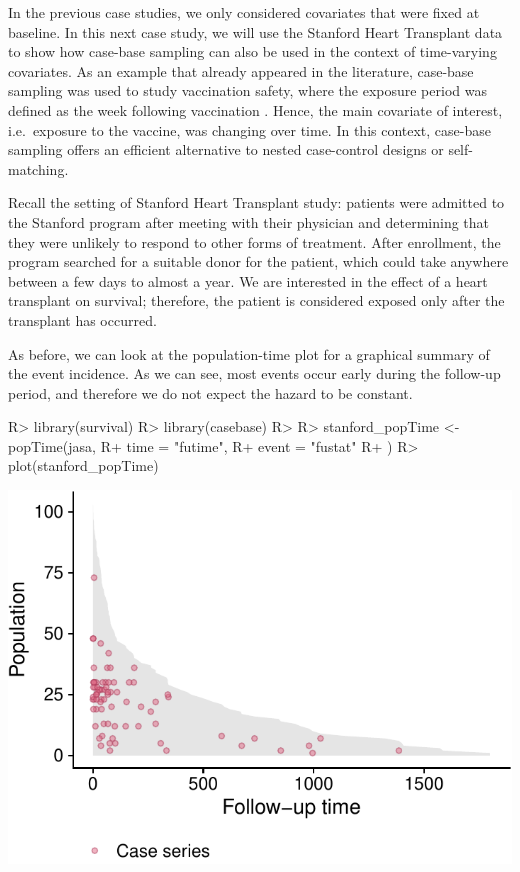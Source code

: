 \documentclass[
]{jss}
\begin{document}
In the previous case studies, we only considered covariates that were
fixed at baseline. In this next case study, we will use the Stanford
Heart Transplant data
\citep[\citet{crowley1977covariance}]{clark1971cardiac} to show how
case-base sampling can also be used in the context of time-varying
covariates. As an example that already appeared in the literature,
case-base sampling was used to study vaccination safety, where the
exposure period was defined as the week following vaccination
\citep{saarela2015case}. Hence, the main covariate of interest,
i.e.~exposure to the vaccine, was changing over time. In this context,
case-base sampling offers an efficient alternative to nested
case-control designs or self-matching.

Recall the setting of Stanford Heart Transplant study: patients were
admitted to the Stanford program after meeting with their physician and
determining that they were unlikely to respond to other forms of
treatment. After enrollment, the program searched for a suitable donor
for the patient, which could take anywhere between a few days to almost
a year. We are interested in the effect of a heart transplant on
survival; therefore, the patient is considered exposed only after the
transplant has occurred.

As before, we can look at the population-time plot for a graphical
summary of the event incidence. As we can see, most events occur early
during the follow-up period, and therefore we do not expect the hazard
to be constant.

\begin{CodeChunk}

\begin{CodeInput}
R> library(survival)
R> library(casebase)
R> 
R> stanford_popTime <- popTime(jasa,
R+   time = "futime",
R+   event = "fustat"
R+ )
R> plot(stanford_popTime)
\end{CodeInput}


\begin{center}\includegraphics{../figures/stanford-poptime-1} \end{center}

\end{CodeChunk}
\end{document}
